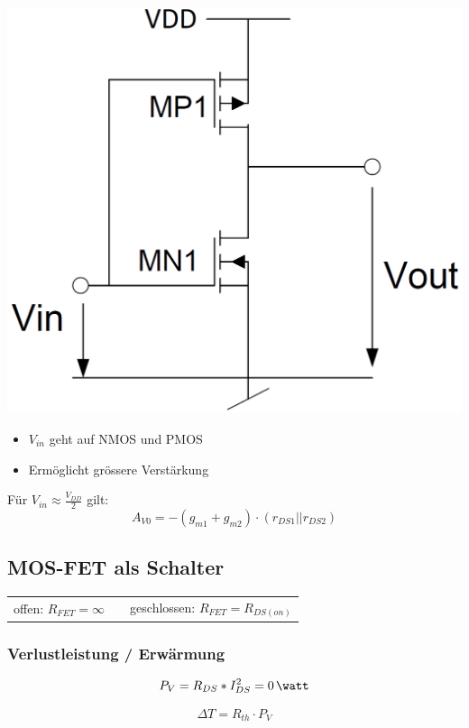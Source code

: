 \begin{minipage}[c]{0.35\columnwidth}
    \includegraphics[width=\columnwidth]{images/push_pull_digital_inverter.png}
\end{minipage}
\hfill
\begin{minipage}[c]{0.5\columnwidth}
    \begin{itemize}
        \item $V_{in}$ geht auf NMOS und PMOS
        \item Ermöglicht grössere Verstärkung
    \end{itemize}
        
    \vspace{0.3cm}
    Für $V_{in} \approx \frac{V_{DD}}{2}$ gilt:
    $$ A_{V0} = -(g_{m1} + g_{m2}) \cdot (r_{DS1} || r_{DS2}) $$
\end{minipage}


\subsection{MOS-FET als Schalter}

\begin{tabular}{l c l}
    offen: $R_{FET} = \infty$ &  & geschlossen: $R_{FET} = R_{DS(on)} $
\end{tabular}


\subsubsection{Verlustleistung / Erwärmung}

\begin{minipage}[c]{0.48\columnwidth}
    $$ P_V = R_{DS} * I_{DS}^2 = 0 \, \watt $$
\end{minipage}
\hfill
\begin{minipage}[c]{0.48\columnwidth}
    $$ \Delta T = R_{th} \cdot P_V $$
\end{minipage}
